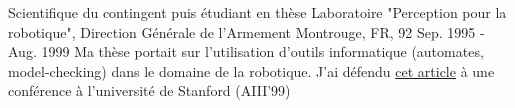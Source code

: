 \begin{cventries}
  \cventry
    {Scientifique du contingent puis étudiant en thèse} %
    {Laboratoire "Perception pour la robotique", Direction Générale de l'Armement} %
    {Montrouge, FR, 92} %
    {Sep. 1995 - Aug. 1999} %
{
Ma thèse portait sur l'utilisation d'outils informatique (automates, model-checking) dans le domaine de la robotique. J'ai défendu \href{http://www.aaai.org/Papers/Symposia/Spring/1999/SS-99-05/SS99-05-001.pdf}{cet article} à une conférence à l'université de Stanford (AIII'99)
} %
    {} %

\end{cventries}
